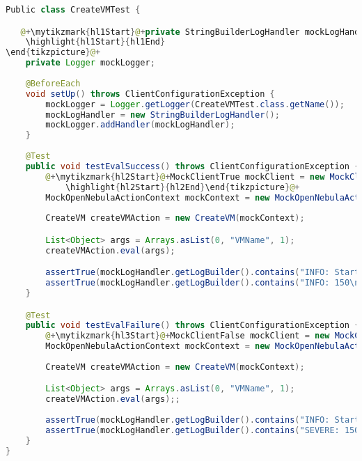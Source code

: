 \begin{lstlisting}[language=Java, caption=CreateVMTest, label=code:CreateVMTest, basicstyle=\fontsize{9}{10}\ttfamily]
Public class CreateVMTest {

   @+\mytikzmark{hl1Start}@+private StringBuilderLogHandler mockLogHandler;@+\mytikzmark{hl1End}@+@+\begin{tikzpicture}[remember picture, overlay]
    \highlight{hl1Start}{hl1End}
\end{tikzpicture}@+
	private Logger mockLogger;
	
	@BeforeEach
	void setUp() throws ClientConfigurationException {
		mockLogger = Logger.getLogger(CreateVMTest.class.getName());
		mockLogHandler = new StringBuilderLogHandler();
		mockLogger.addHandler(mockLogHandler);
	}
	
    @Test
    public void testEvalSuccess() throws ClientConfigurationException {
    	@+\mytikzmark{hl2Start}@+MockClientTrue mockClient = new MockClientTrue("150");@+\mytikzmark{hl2End}@+@+\begin{tikzpicture}[remember picture, overlay]
            \highlight{hl2Start}{hl2End}\end{tikzpicture}@+
    	MockOpenNebulaActionContext mockContext = new MockOpenNebulaActionContext(mockClient, mockLogger);
    	
        CreateVM createVMAction = new CreateVM(mockContext);

        List<Object> args = Arrays.asList(0, "VMName", 1);
        createVMAction.eval(args);

        assertTrue(mockLogHandler.getLogBuilder().contains("INFO: Starting VM: [1, VMName]\n"));
        assertTrue(mockLogHandler.getLogBuilder().contains("INFO: 150\n"));
    }

    @Test
    public void testEvalFailure() throws ClientConfigurationException {
    	@+\mytikzmark{hl3Start}@+MockClientFalse mockClient = new MockClientFalse("150");@+\mytikzmark{hl3End}@+
    	MockOpenNebulaActionContext mockContext = new MockOpenNebulaActionContext(mockClient, mockLogger);
    	
        CreateVM createVMAction = new CreateVM(mockContext);

        List<Object> args = Arrays.asList(0, "VMName", 1);
        createVMAction.eval(args);;
        
        assertTrue(mockLogHandler.getLogBuilder().contains("INFO: Starting VM: [1, VMName]\n"));
        assertTrue(mockLogHandler.getLogBuilder().contains("SEVERE: 150\n"));
    }
}
\end{lstlisting}
